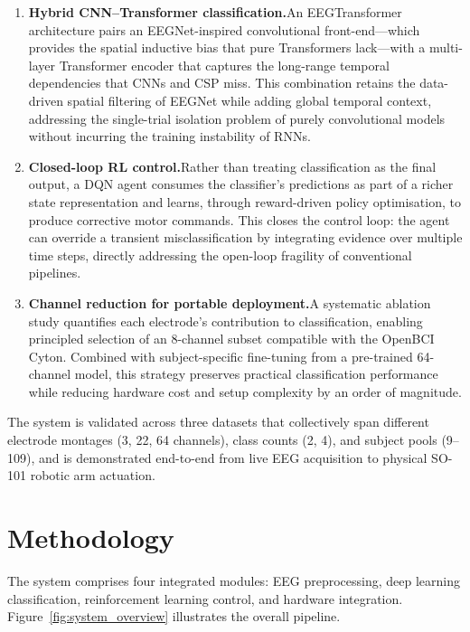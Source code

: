 \documentclass[12pt, a4paper]{article}
\begin{document}
\begin{enumerate}
    \item \textbf{Hybrid CNN--Transformer classification.}\quad An EEGTransformer architecture pairs an EEGNet-inspired convolutional front-end---which provides the spatial inductive bias that pure Transformers lack---with a multi-layer Transformer encoder that captures the long-range temporal dependencies that CNNs and CSP miss. This combination retains the data-driven spatial filtering of EEGNet while adding global temporal context, addressing the single-trial isolation problem of purely convolutional models without incurring the training instability of RNNs.

    \item \textbf{Closed-loop RL control.}\quad Rather than treating classification as the final output, a DQN agent consumes the classifier's predictions as part of a richer state representation and learns, through reward-driven policy optimisation, to produce corrective motor commands. This closes the control loop: the agent can override a transient misclassification by integrating evidence over multiple time steps, directly addressing the open-loop fragility of conventional pipelines.

    \item \textbf{Channel reduction for portable deployment.}\quad A systematic ablation study quantifies each electrode's contribution to classification, enabling principled selection of an 8-channel subset compatible with the OpenBCI Cyton. Combined with subject-specific fine-tuning from a pre-trained 64-channel model, this strategy preserves practical classification performance while reducing hardware cost and setup complexity by an order of magnitude.
\end{enumerate}

The system is validated across three datasets that collectively span different electrode montages (3, 22, 64 channels), class counts (2, 4), and subject pools (9--109), and is demonstrated end-to-end from live EEG acquisition to physical SO-101 robotic arm actuation.

\section{Methodology}

The system comprises four integrated modules: EEG preprocessing, deep learning classification, reinforcement learning control, and hardware integration. Figure~\ref{fig:system_overview} illustrates the overall pipeline.
\end{document}

